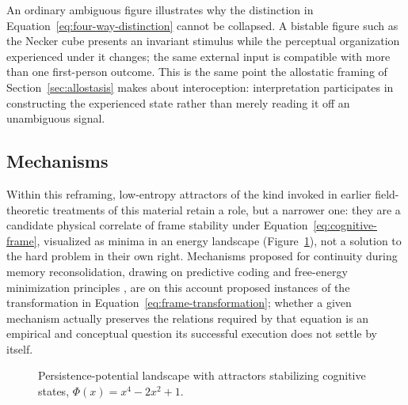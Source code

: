 \documentclass[12pt]{article}
\begin{document}
An ordinary ambiguous figure illustrates why the distinction in Equation~\eqref{eq:four-way-distinction} cannot be collapsed. A bistable figure such as the Necker cube presents an invariant stimulus while the perceptual organization experienced under it changes; the same external input is compatible with more than one first-person outcome. This is the same point the allostatic framing of Section~\ref{sec:allostasis} makes about interoception: interpretation participates in constructing the experienced state rather than merely reading it off an unambiguous signal.

\subsection{Mechanisms}

Within this reframing, low-entropy attractors of the kind invoked in earlier field-theoretic treatments of this material retain a role, but a narrower one: they are a candidate physical correlate of frame stability under Equation~\eqref{eq:cognitive-frame}, visualized as minima in an energy landscape (Figure~\ref{fig:attractor}), not a solution to the hard problem in their own right. Mechanisms proposed for continuity during memory reconsolidation, drawing on predictive coding and free-energy minimization principles \cite{friston2010}, are on this account proposed instances of the transformation in Equation~\eqref{eq:frame-transformation}; whether a given mechanism actually preserves the relations required by that equation is an empirical and conceptual question its successful execution does not settle by itself.

\begin{figure}[h]
\centering
{}
\caption{Persistence-potential landscape with attractors stabilizing cognitive states, $\Phi(x) = x^4 - 2x^2 + 1$.}
\label{fig:attractor}
\end{figure}
\end{document}
